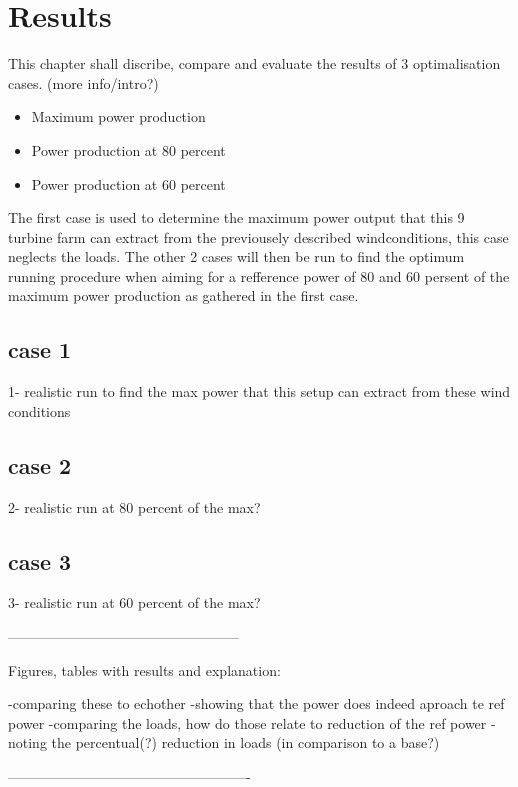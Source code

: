 \section{Results}

This chapter shall discribe, compare and evaluate the results of 3 optimalisation cases. (more info/intro?)
\begin{itemize}
	\item Maximum power production
	\item Power production at 80 percent 
	\item Power production at 60 percent 
\end{itemize}
The first case is used to determine the maximum power output that this 9 turbine farm can extract from the previousely described windconditions, this case neglects the loads. The other 2 cases will then be run to find the optimum running procedure when aiming for a refference power of 80 and 60 persent of the maximum power production as gathered in the first case.

 \subsection{case 1}
 1- realistic run to find the max power that this setup can extract from these wind conditions
 
 \subsection{case 2}
 2- realistic run at 80 percent of the max?
 
 \subsection{case 3}
 3- realistic run at 60 percent of the max?
 
 
--------------------------------------------------


Figures, tables with results and explanation:
   
 

  		-comparing these to echother
    	-showing that the power does indeed aproach te ref power
    	-comparing the loads, how do those relate to reduction of the ref power
  		-noting the percentual(?) reduction in loads (in comparison to a base?)
 
----------------------------------------------------   
         